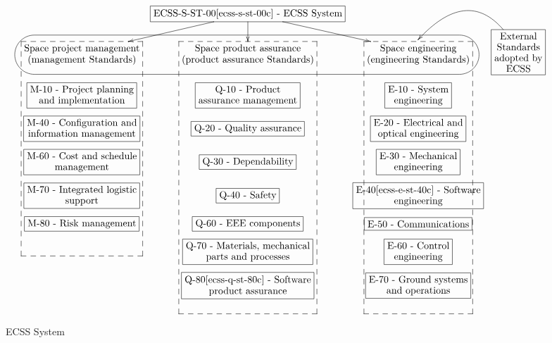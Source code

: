 \else
\begin{figure}[!ht]
\footnotesize
\begin{displaymath}
\xymatrix@=.28cm{
  & *+[F-]{\txt{ECSS-S-ST-00\cite{ecss-s-st-00c} - ECSS System}} \ar@{->}[d] \ar@{->}[dl] \ar@{->}[dr] & \\
	\h\a{\txt{Space project management\\(management Standards)}}
  & \b{\txt{Space product assurance\\(product assurance Standards)}}
  & \b{\txt{Space engineering\\(engineering Standards)}} & *+[F]{\txt{External\\Standards\\adopted by\\ECSS}}\ar@/{}_{3pc}/@{->}[];"h"+<3.1pt,28.3pt>+\\
	*+[F]{\txt{M-10 - Project planning\\and implementation}}
  & *+[F]{\txt{Q-10 - Product\\assurance management}}
  & *+[F]{\txt{E-10 - System\\engineering}}\\
	*+[F]{\txt{M-40 - Configuration and\\information management}}
  & *+[F]{\txt{Q-20 - Quality assurance}}
  & *+[F]{\txt{E-20 - Electrical and\\optical engineering}}\\
	*+[F]{\txt{M-60 - Cost and schedule\\management}}
  & *+[F]{\txt{Q-30 - Dependability}}
  & *+[F]{\txt{E-30 - Mechanical\\engineering}}\\
	*+[F]{\txt{M-70 - Integrated logistic\\support}}
  & *+[F]{\txt{Q-40 - Safety}}
  & *+[F]{\txt{E-40\cite{ecss-e-st-40c} - Software\\engineering}}\\
	*+[F]{\txt{M-80 - Risk management}}
  & *+[F]{\txt{Q-60 - EEE components}}
  & *+[F]{\txt{E-50 - Communications}}\\
  & *+[F]{\txt{Q-70 - Materials, mechanical\\parts and processes}}
  & *+[F]{\txt{E-60 - Control\\engineering}}\\
  & *+[F]{\txt{Q-80\cite{ecss-q-st-80c} - Software\\product assurance}}
  & *+[F]{\txt{E-70 - Ground systems\\and operations}}\\
  & & &
}
\end{displaymath}
    \caption{ECSS System}\label{fig:ecssdocsstruct}
\end{figure}
\fi

